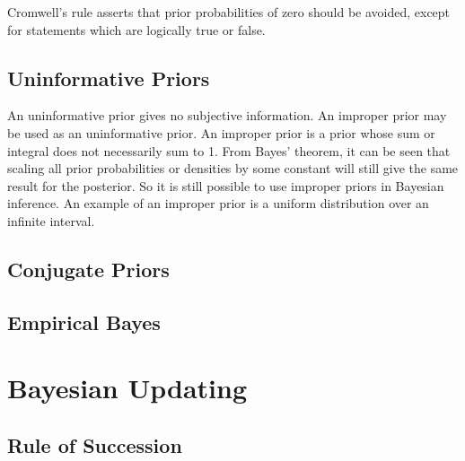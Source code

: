 \documentclass[11pt]{report} %
\begin{document}
Cromwell's rule asserts that prior probabilities of zero should be avoided, except for statements which are logically true or false.

\subsection{Uninformative Priors}

An uninformative prior gives no subjective information. An improper prior may be used as an uninformative prior. An improper prior is a prior whose sum or integral does not necessarily sum to 1. From Bayes' theorem, it can be seen that scaling all prior probabilities or densities by some constant will still give the same result for the posterior. So it is still possible to use improper priors in Bayesian inference. An example of an improper prior is a uniform distribution over an infinite interval.

\subsection{Conjugate Priors}

\subsection{Empirical Bayes}

\section{Bayesian Updating}

\subsection{Rule of Succession}
\end{document}
